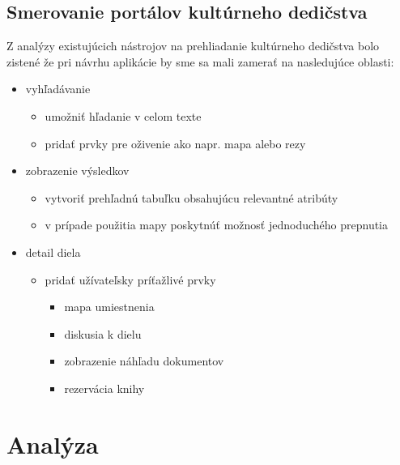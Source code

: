 \documentclass[
  print, %
  table,   %
  lof,     %
  nolot,     %
]{fithesis3}
\begin{document}
\section{Smerovanie portálov kultúrneho dedičstva}
Z analýzy existujúcich nástrojov na prehliadanie kultúrneho dedičstva bolo zistené že pri návrhu aplikácie by sme sa mali zamerať na nasledujúce oblasti:
\begin{itemize}
	\item vyhľadávanie
	\begin{itemize}
		\item umožniť hľadanie v celom texte 
		\item pridať prvky pre oživenie ako napr. mapa alebo rezy
	\end{itemize}
	\item zobrazenie výsledkov
	\begin{itemize}
		\item vytvoriť prehľadnú tabuľku obsahujúcu relevantné atribúty
		\item v prípade použitia mapy poskytnúť možnosť jednoduchého prepnutia 
	\end{itemize}
	\item detail diela
	\begin{itemize}
		\item pridať užívateľsky príťažlivé prvky
		\begin{itemize}
			\item mapa umiestnenia				
			\item diskusia k dielu
			\item zobrazenie náhľadu dokumentov
			\item rezervácia knihy
		\end{itemize}
	\end{itemize}	
\end{itemize}

\chapter{Analýza}
\end{document}
